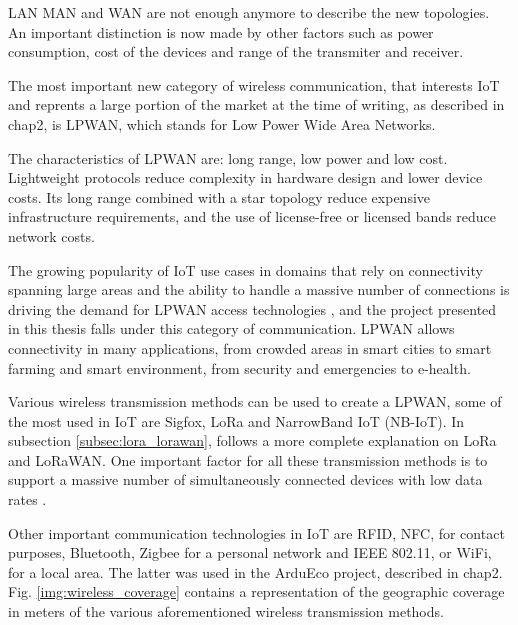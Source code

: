 	LAN MAN and WAN are not enough anymore to describe the new topologies.
	An important distinction is now made by other factors such as power consumption, cost of the devices and range of the transmiter and receiver.
	
	The most important new category of wireless communication, that interests IoT and reprents a large portion of the market at the time of writing, as described in chap2, is LPWAN, which stands for Low Power Wide Area Networks.
	
	The characteristics of LPWAN are: long range, low power and low cost.
	Lightweight protocols reduce complexity in hardware design and lower device costs. Its long range combined with a star topology reduce expensive infrastructure requirements, and the use of license-free or licensed bands reduce network costs.

	The growing popularity of IoT use cases in domains that rely on connectivity spanning large areas and the ability to handle a massive number of connections is driving the demand for LPWAN access technologies \cite{fi12030046}, and the project presented in this thesis falls under this category of communication.
	LPWAN allows connectivity in many applications, from crowded areas in smart cities to smart farming and smart environment, from security and emergencies to e-health.
	
	Various wireless transmission methods can be used to create a LPWAN, some of the most used in IoT are Sigfox, LoRa and NarrowBand IoT (NB-IoT).
	In subsection \ref{subsec:lora_lorawan}, follows a more complete explanation on LoRa and LoRaWAN.
	One important factor for all these transmission methods is to support a massive number of simultaneously connected devices with low data rates \cite{fi12030046}.
	
	Other important communication technologies in IoT are RFID, NFC, for contact purposes, Bluetooth, Zigbee for a personal network and IEEE 802.11, or WiFi, for a local area.
	The latter was used in the ArduEco project, described in chap2.
	Fig. \ref{img:wireless_coverage} contains a representation of the geographic coverage in meters of the various aforementioned wireless transmission methods.

